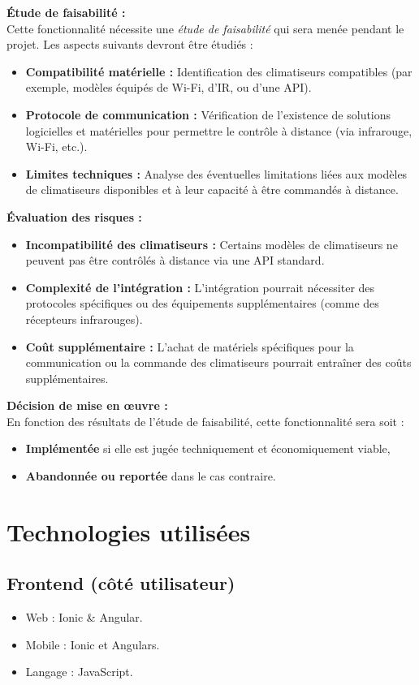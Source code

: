 \documentclass[a4paper,12pt]{article}
\begin{document}
\textbf{Étude de faisabilité :} \\
Cette fonctionnalité nécessite une \textit{étude de faisabilité} qui sera menée pendant le projet. Les aspects suivants devront être étudiés :
\begin{itemize}
    \item \textbf{Compatibilité matérielle :} Identification des climatiseurs compatibles (par exemple, modèles équipés de Wi-Fi, d'IR, ou d'une API).
    \item \textbf{Protocole de communication :} Vérification de l'existence de solutions logicielles et matérielles pour permettre le contrôle à distance (via infrarouge, Wi-Fi, etc.).
    \item \textbf{Limites techniques :} Analyse des éventuelles limitations liées aux modèles de climatiseurs disponibles et à leur capacité à être commandés à distance.
\end{itemize}

\textbf{Évaluation des risques :}
\begin{itemize}
    \item \textbf{Incompatibilité des climatiseurs :} Certains modèles de climatiseurs ne peuvent pas être contrôlés à distance via une API standard.
    \item \textbf{Complexité de l'intégration :} L'intégration pourrait nécessiter des protocoles spécifiques ou des équipements supplémentaires (comme des récepteurs infrarouges).
    \item \textbf{Coût supplémentaire :} L'achat de matériels spécifiques pour la communication ou la commande des climatiseurs pourrait entraîner des coûts supplémentaires.
\end{itemize}

\textbf{Décision de mise en œuvre :} \\
En fonction des résultats de l'étude de faisabilité, cette fonctionnalité sera soit :
\begin{itemize}
    \item \textbf{Implémentée} si elle est jugée techniquement et économiquement viable,
    \item \textbf{Abandonnée ou reportée} dans le cas contraire.
\end{itemize}

\section{Technologies utilisées}
\subsection{Frontend (côté utilisateur)}
\begin{itemize}
    \item Web : Ionic \&  Angular.
    \item Mobile : Ionic et Angulars.
  \item Langage : JavaScript.

\end{itemize}
\end{document}
